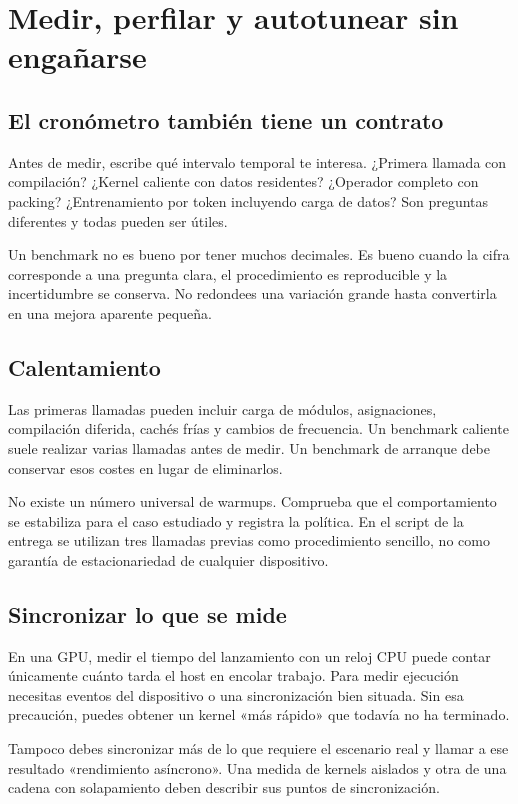 \documentclass[12pt,a4paper,oneside]{report}
\begin{document}
\chapter{Medir, perfilar y autotunear sin engañarse}
\label{ch:benchmark}
\section{El cronómetro también tiene un contrato}
Antes de medir, escribe qué intervalo temporal te interesa. ¿Primera llamada con compilación? ¿Kernel caliente con datos residentes? ¿Operador completo con packing? ¿Entrenamiento por token incluyendo carga de datos? Son preguntas diferentes y todas pueden ser útiles.

Un benchmark no es bueno por tener muchos decimales. Es bueno cuando la cifra corresponde a una pregunta clara, el procedimiento es reproducible y la incertidumbre se conserva. No redondees una variación grande hasta convertirla en una mejora aparente pequeña.

\section{Calentamiento}
Las primeras llamadas pueden incluir carga de módulos, asignaciones, compilación diferida, cachés frías y cambios de frecuencia. Un benchmark caliente suele realizar varias llamadas antes de medir. Un benchmark de arranque debe conservar esos costes en lugar de eliminarlos.

No existe un número universal de warmups. Comprueba que el comportamiento se estabiliza para el caso estudiado y registra la política. En el script de la entrega se utilizan tres llamadas previas como procedimiento sencillo, no como garantía de estacionariedad de cualquier dispositivo.

\section{Sincronizar lo que se mide}
En una GPU, medir el tiempo del lanzamiento con un reloj CPU puede contar únicamente cuánto tarda el host en encolar trabajo. Para medir ejecución necesitas eventos del dispositivo o una sincronización bien situada. Sin esa precaución, puedes obtener un kernel «más rápido» que todavía no ha terminado.

Tampoco debes sincronizar más de lo que requiere el escenario real y llamar a ese resultado «rendimiento asíncrono». Una medida de kernels aislados y otra de una cadena con solapamiento deben describir sus puntos de sincronización.
\end{document}
